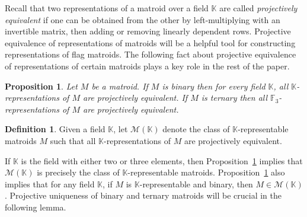 \documentclass[12pt]{article}
\newtheorem{prop}[thm]{Proposition}
\theoremstyle{definition}
\newtheorem{defn}[thm]{Definition}
\begin{document}
Recall that two representations of a matroid over a field $\mathbb{K}$ are called \emph{projectively equivalent} if one can be obtained from
the other by left-multiplying with an invertible matrix, then adding or removing linearly dependent rows.
Projective equivalence of representations of matroids will be a helpful tool for constructing representations of flag matroids.
The following fact about projective equivalence of representations of certain matroids plays a key role in the rest of the paper.

\begin{prop}{\cite[Proposition 6.6.5 and Corollary 14.6.1]{oxley}}\label{prop: binary and ternary are projectively unique}
    Let $M$ be a matroid.
    If $M$ is binary then for every field $\mathbb{K}$, all $\mathbb{K}$-representations of $M$ are projectively equivalent.
    If $M$ is ternary then all $\mathbb{F}_3$-representations of $M$ are projectively equivalent.
\end{prop}

\begin{defn}\label{defn: matroids whose K-reps are projectively equivalent}
    Given a field $\mathbb{K}$, let $\mathcal{M}(\mathbb{K})$ denote the class of $\mathbb{K}$-representable matroids $M$ such that
    all $\mathbb{K}$-representations of $M$ are projectively equivalent.
\end{defn}

If $\mathbb{K}$ is the field with either two or three elements, then Proposition~\ref{prop: binary and ternary are projectively unique}
implies that $\mathcal{M}(\mathbb{K})$ is precisely the class of $\mathbb{K}$-representable matroids.
Proposition~\ref{prop: binary and ternary are projectively unique} also implies that
for any field $\mathbb{K}$, if $M$ is $\mathbb{K}$-representable and binary, then $M \in \mathcal{M}(\mathbb{K})$. Projective uniqueness of binary and ternary matroids will be crucial in the following lemma. 
\end{document}
